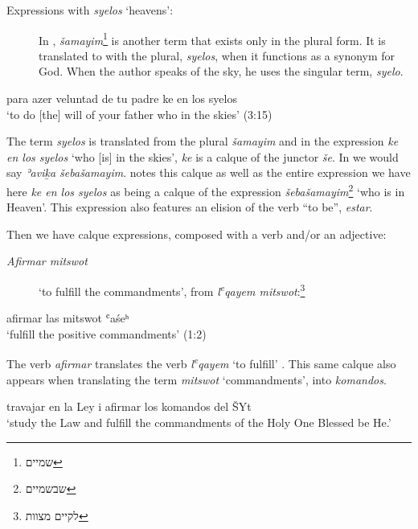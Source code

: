 \documentclass[output=paper,colorlinks,citecolor=brown,babel,arabicfont]{langscibook}
\begin{document}
\begin{description}

\item[Expressions with \textit{syelos} `heavens':]

In , \textit{šamayim}\footnote{\texthebrew{שמיים}} is another term that exists only in the plural form. It is translated to  with the plural, \textit{syelos}, when it functions as a synonym for God. When the author speaks of the sky, he uses the singular term, \textit{syelo}. 
\end{description}

\ea\label{ch3.7.ex.n24}
para azer	veluntad de tu padre  ke	  en los syelos \\
`to do [the] will of your father who in the skies' (3:15)
\z

The term \textit{syelos} is translated from the  plural \textit{šamayim} and in the expression \textit{ke en los syelos} `who [is] in the skies', \textit{ke} is a calque of the  junctor \textit{še}. In  we would say \textit{ʾavi\b{k}a šebašamayim}. \citet[447--448]{schwarzwald_rodrigue1989b} notes this calque as well as the entire expression we have here \textit{ke en los syelos} as being a calque of the  expression \textit{šebašamayim}\footnote{\texthebrew{שבשמיים}} `who is in Heaven'. This expression also features an elision of the verb ``to be'', \textit{estar}.

Then we have calque expressions, composed with a verb and/or an adjective:

\begin{description}

\item[\textit{Afirmar mitswot}] `to fulfill the commandments', from  \textit{l\textsuperscript{e}qayem mitswot}:\footnote{\texthebrew{לקיים מצוות}}
\end{description}

\ea\label{ch3.7.ex.n25}
afirmar las mitswot  ʿaśeʰ \\
`fulfill  the positive commandments' (1:2)
\z

The  verb \textit{afirmar} translates the  verb \textit{l\textsuperscript{e}qayem} `to fulfill' \citep[426]{schwarzwald_rodrigue1989b}. This same calque also appears when translating the  term \textit{mitswot} `commandments', into  \textit{komandos}.

\ea\label{ch3.7.ex.n26}
travajar en la Ley i afirmar los komandos 	 del	ŠYt \\
`study the Law and fulfill the commandments of the Holy One Blessed be He.'
\z
\end{document}
